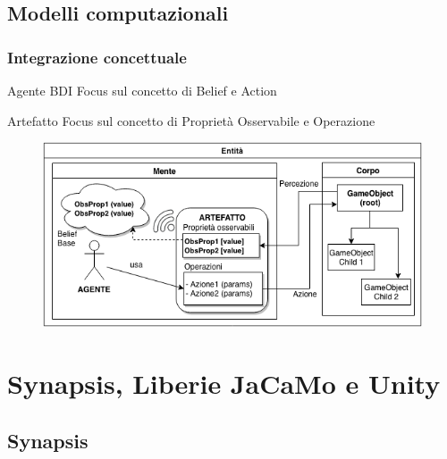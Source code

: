 \documentclass[handout]{beamer}\mode<presentation>{\usetheme{AMSCesenaBleu}}
\begin{document}
\subsection{Modelli computazionali}

\begin{frame}
\frametitle[Stack Tecnologico]{Integrazione concettuale}

\begin{block}{Agente BDI}
    Focus sul concetto di \alert{Belief} e \alert{Action}
\end{block}

\begin{block}{Artefatto}
    Focus sul concetto di \alert{Proprietà Osservabile} e \alert{Operazione}
\end{block}

\begin{figure}
    \includegraphics[width=0.8\linewidth]{figures/Ridefinizione_entita.png}
\end{figure}

\end{frame}

\section{Synapsis, Liberie JaCaMo e Unity}

\subsection{Synapsis}
\end{document}
